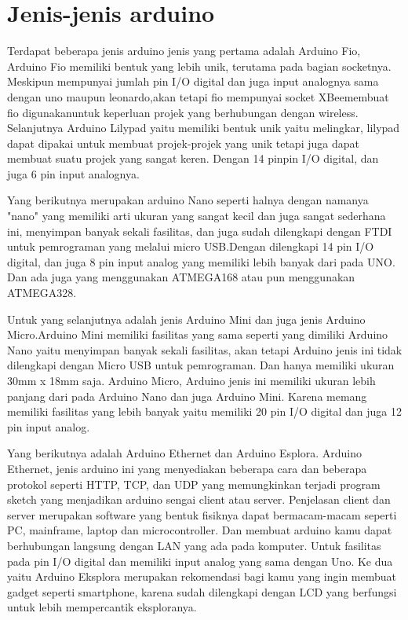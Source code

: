 \section{Jenis-jenis arduino}
	Terdapat beberapa jenis arduino jenis yang pertama adalah Arduino Fio, Arduino Fio memiliki bentuk yang lebih unik, terutama pada bagian socketnya. Meskipun mempunyai jumlah pin I/O digital dan juga input analognya sama dengan uno maupun leonardo,akan tetapi fio mempunyai socket XBeemembuat fio digunakanuntuk keperluan projek yang berhubungan dengan wireless. Selanjutnya Arduino Lilypad yaitu memiliki bentuk unik yaitu melingkar, lilypad dapat dipakai untuk membuat projek-projek yang unik tetapi juga dapat membuat suatu projek yang sangat keren.
	Dengan 14 pinpin I/O digital, dan juga 6 pin input analognya.


	Yang berikutnya merupakan arduino Nano seperti halnya dengan namanya "nano" yang memiliki arti ukuran  yang sangat kecil dan juga sangat sederhana ini, menyimpan banyak sekali fasilitas, dan juga sudah dilengkapi dengan FTDI untuk pemrograman yang melalui micro USB.Dengan dilengkapi 14 pin I/O digital, dan juga 8 pin input analog yang memiliki lebih banyak dari pada UNO. Dan ada juga yang menggunakan ATMEGA168 atau pun menggunakan ATMEGA328.

	Untuk yang selanjutnya adalah jenis Arduino Mini dan juga jenis Arduino Micro.Arduino Mini memiliki fasilitas yang sama seperti yang dimiliki Arduino Nano yaitu menyimpan banyak sekali fasilitas, akan tetapi Arduino jenis ini tidak dilengkapi dengan Micro USB untuk pemrograman. Dan hanya memiliki ukuran 30mm x 18mm saja.
	Arduino Micro, Arduino jenis ini memiliki ukuran lebih panjang dari pada Arduino Nano dan juga Arduino Mini. Karena memang memiliki fasilitas yang lebih banyak yaitu memiliki 20 pin I/O digital dan juga 12 pin input analog.


	Yang berikutnya adalah Arduino Ethernet dan Arduino Esplora. Arduino Ethernet, jenis arduino ini yang menyediakan beberapa cara dan beberapa protokol seperti HTTP, TCP, dan UDP yang memungkinkan terjadi program sketch yang menjadikan arduino sengai client atau server. Penjelasan client dan server merupakan software yang bentuk fisiknya dapat bermacam-macam seperti PC, mainframe, laptop dan microcontroller. Dan membuat arduino kamu dapat berhubungan langsung dengan LAN yang ada pada komputer. Untuk fasilitas pada pin I/O digital dan memiliki input analog yang sama dengan Uno. 
	Ke dua yaitu Arduino Eksplora merupakan rekomendasi bagi kamu yang ingin membuat gadget seperti smartphone, karena sudah dilengkapi dengan LCD yang berfungsi untuk lebih mempercantik eksploranya.

